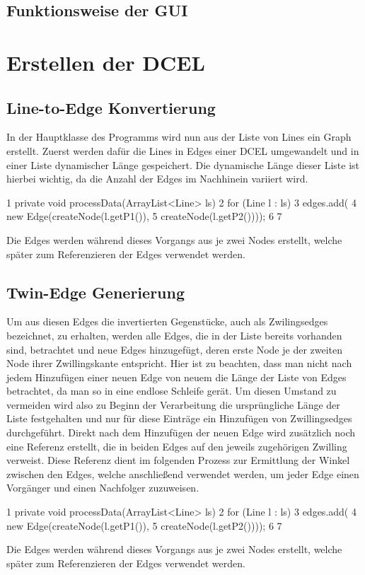 \subsection{Funktionsweise der GUI}

\section{Erstellen der DCEL}
\subsection{Line-to-Edge Konvertierung}
In der Hauptklasse des Programms wird nun aus der Liste von Lines ein Graph erstellt. 
Zuerst werden dafür die Lines in Edges einer DCEL umgewandelt und in einer Liste dynamischer Länge gespeichert. 
Die dynamische Länge dieser Liste ist hierbei wichtig, da die Anzahl der Edges im Nachhinein variiert wird.
\begin{code}
	1	private void processData(ArrayList<Line> ls) {
		2		for (Line l : ls) {
			3			edges.add(
			4	 		new Edge(createNode(l.getP1()), 
			5	 		createNode(l.getP2())));
			6		}
		7	}

\end{code}
Die Edges werden während dieses Vorgangs aus je zwei Nodes erstellt, welche später zum Referenzieren der Edges verwendet werden.
\subsection{Twin-Edge Generierung}
Um aus diesen Edges die invertierten Gegenstücke, auch als Zwilingsedges bezeichnet, zu erhalten, werden alle Edges, die in der Liste bereits vorhanden sind, betrachtet und neue Edges hinzugefügt, deren erste Node je der zweiten Node ihrer Zwillingskante entspricht.
Hier ist zu beachten, dass man nicht nach jedem Hinzufügen einer neuen Edge von neuem die Länge der Liste von Edges betrachtet, da man so in eine endlose Schleife gerät. 
Um diesen Umstand zu vermeiden wird also zu Beginn der Verarbeitung die ursprüngliche Länge der Liste festgehalten und nur für diese Einträge ein Hinzufügen von Zwillingsedges durchgeführt.
Direkt nach dem Hinzufügen der neuen Edge wird zusätzlich noch eine Referenz erstellt, die in beiden Edges auf den jeweils zugehörigen Zwilling verweist. 
Diese Referenz dient im folgenden Prozess zur Ermittlung der Winkel zwischen den Edges, welche anschließend verwendet werden, um jeder Edge einen Vorgänger und einen Nachfolger zuzuweisen.
\begin{code}
	1	private void processData(ArrayList<Line> ls) {
		2		for (Line l : ls) {
			3			edges.add(
			4	 		new Edge(createNode(l.getP1()), 
			5	 		createNode(l.getP2())));
			6		}
		7	}
	
\end{code}
Die Edges werden während dieses Vorgangs aus je zwei Nodes erstellt, welche später zum Referenzieren der Edges verwendet werden. 
